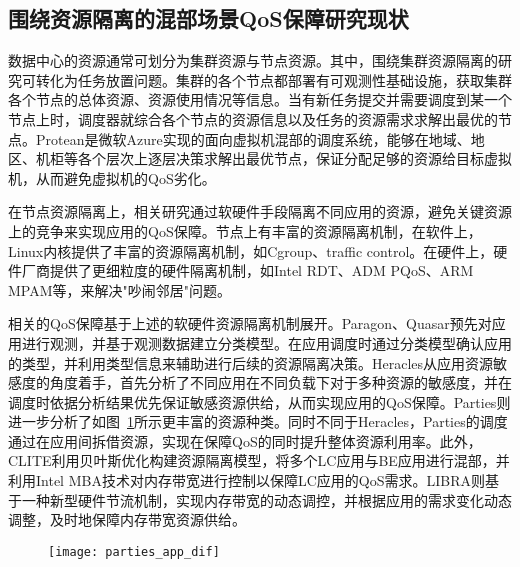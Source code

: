 \subsection{围绕资源隔离的混部场景QoS保障研究现状}


数据中心的资源通常可划分为集群资源与节点资源。其中，围绕集群资源隔离的研究可转化为任务放置问题。集群的各个节点都部署有可观测性基础设施，获取集群各个节点的总体资源、资源使用情况等信息。当有新任务提交并需要调度到某一个节点上时，调度器就综合各个节点的资源信息以及任务的资源需求求解出最优的节点。Protean\citep{hadary2020protean}是微软Azure实现的面向虚拟机混部的调度系统，能够在地域、地区、机柜等各个层次上逐层决策求解出最优节点，保证分配足够的资源给目标虚拟机，从而避免虚拟机的QoS劣化。

在节点资源隔离上，相关研究通过软硬件手段隔离不同应用的资源，避免关键资源上的竞争来实现应用的QoS保障。节点上有丰富的资源隔离机制，在软件上，Linux内核提供了丰富的资源隔离机制，如Cgroup、traffic control。在硬件上，硬件厂商提供了更细粒度的硬件隔离机制，如Intel RDT、ADM PQoS\citep{amdpqos}、ARM MPAM\citep{armmpam}等，来解决"吵闹邻居"问题\citep{xu2018dcat, maricq2018taming, rzadca2020autopilot, kwon2020dc}。

相关的QoS保障基于上述的软硬件资源隔离机制展开。Paragon\citep{delimitrou2013paragon}、Quasar\citep{delimitrou2014quasar}预先对应用进行观测，并基于观测数据建立分类模型。在应用调度时通过分类模型确认应用的类型，并利用类型信息来辅助进行后续的资源隔离决策。Heracles\citep{lo2015heracles}从应用资源敏感度的角度着手，首先分析了不同应用在不同负载下对于多种资源的敏感度，并在调度时依据分析结果优先保证敏感资源供给，从而实现应用的QoS保障。Parties\citep{chen2019parties}则进一步分析了如图~\ref{fig:parties_app_dif}所示更丰富的资源种类。同时不同于Heracles，Parties的调度通过在应用间拆借资源，实现在保障QoS的同时提升整体资源利用率。此外，CLITE\citep{patel2020clite}利用贝叶斯优化构建资源隔离模型，将多个LC应用与BE应用进行混部，并利用Intel MBA技术对内存带宽进行控制以保障LC应用的QoS需求。LIBRA\citep{zhang2021libra}则基于一种新型硬件节流机制，实现内存带宽的动态调控，并根据应用的需求变化动态调整，及时地保障内存带宽资源供给。

\begin{figure}[!htbp]
    \centering
    \texttt{[image: parties\_app\_dif]}
    \label{fig:parties_app_dif}
\end{figure}

